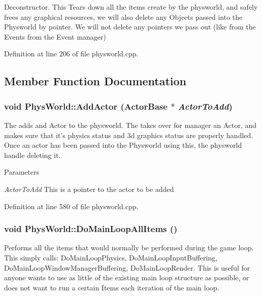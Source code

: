 Deconstructor. This Tears down all the items create by the physworld, and safely frees any graphical resources, we will also delete any Objects passed into the Physworld by pointer. We will not delete any pointers we pass out (like from the Events from the Event manager) 

Definition at line 206 of file physworld.cpp.

\subsection{Member Function Documentation}
\hypertarget{classPhysWorld_ae490054b3e1c4c5aa69cb8e3b7bd2f29}{
\subsubsection[{AddActor}]{\setlength{\rightskip}{0pt plus 5cm}void PhysWorld::AddActor ({\bf ActorBase} $\ast$ {\em ActorToAdd})}}
\label{db/df5/classPhysWorld_ae490054b3e1c4c5aa69cb8e3b7bd2f29}


The adds and Actor to the physworld. The takes over for manager an Actor, and makes sure that it's physics status and 3d graphics status are properly handled. Once an actor has been passed into the Physworld using this, the physworld handle deleting it. 
\begin{DoxyParams}{Parameters}
\item[{\em ActorToAdd}]This is a pointer to the actor to be added \end{DoxyParams}


Definition at line 580 of file physworld.cpp.\hypertarget{classPhysWorld_a60b7978b39fc347c2f37077737783da6}{
\subsubsection[{DoMainLoopAllItems}]{\setlength{\rightskip}{0pt plus 5cm}void PhysWorld::DoMainLoopAllItems ()}}
\label{db/df5/classPhysWorld_a60b7978b39fc347c2f37077737783da6}


Performs all the items that would normally be performed during the game loop. This simply calls: DoMainLoopPhysics, DoMainLoopInputBuffering, DoMainLoopWindowManagerBuffering, DoMainLoopRender. This is useful for anyone wants to use as little of the existing main loop structure as possible, or does not want to run a certain Items each iteration of the main loop. 

